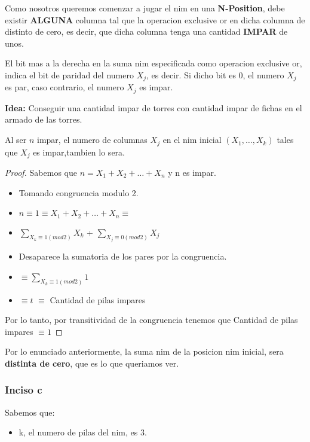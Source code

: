 \begin{corollary}
	Como nosotros queremos comenzar a jugar el nim en una \textbf{N-Position}, debe existir \textbf{ALGUNA} columna tal que la operacion exclusive or en dicha columna de distinto de cero, es decir, que dicha columna tenga una cantidad \textbf{IMPAR} de unos.
\end{corollary}

\begin{lemma}
	El bit mas a la derecha en la suma nim especificada como operacion exclusive or, indica el bit de paridad del numero $X_j$, es decir. Si dicho bit es 0, el numero $X_j$ es par, caso contrario, el numero $X_j$ es impar.
\end{lemma}

\textbf{Idea:} Conseguir una cantidad impar de torres con cantidad impar de fichas en el armado de las torres.\\

\begin{theorem}[]
	Al ser $n$ impar, el numero de columnas $X_j$ en el nim inicial $(X_1, \dots, X_k)$ tales que $X_j$ es impar,tambien lo sera.
\end{theorem}

\begin{proof}

Sabemos que $n = X_1 + X_2 + \dots + X_n $ y n es impar.

\begin{itemize}
	\item[] Tomando congruencia modulo 2.
	\item[] $n \equiv 1 \equiv X_1 + X_2 + \dots + X_n \equiv $
	\item[] $\sum\limits_{X_k \equiv 1( mod 2 )} X_k$ + $\sum\limits_{X_j \equiv 0( mod 2 )} X_j$
	\item[] Desaparece la sumatoria de los pares por la congruencia.
	\item[] $\equiv \sum\limits_{X_k \equiv 1( mod 2 )} 1$
	\item[] $\equiv t$ $ \equiv $ {Cantidad de pilas impares} 
\end{itemize}

Por lo tanto, por transitividad de la congruencia tenemos que {Cantidad de pilas impares} $\equiv 1$
\end{proof}

Por lo enunciado anteriormente, la suma nim de la posicion nim inicial, sera \textbf{distinta de cero}, que es lo que queriamos ver.

\subsubsection{Inciso c}
Sabemos que:
\begin{itemize}
	\item k, el numero de pilas del nim, es 3. 
\end{itemize}


